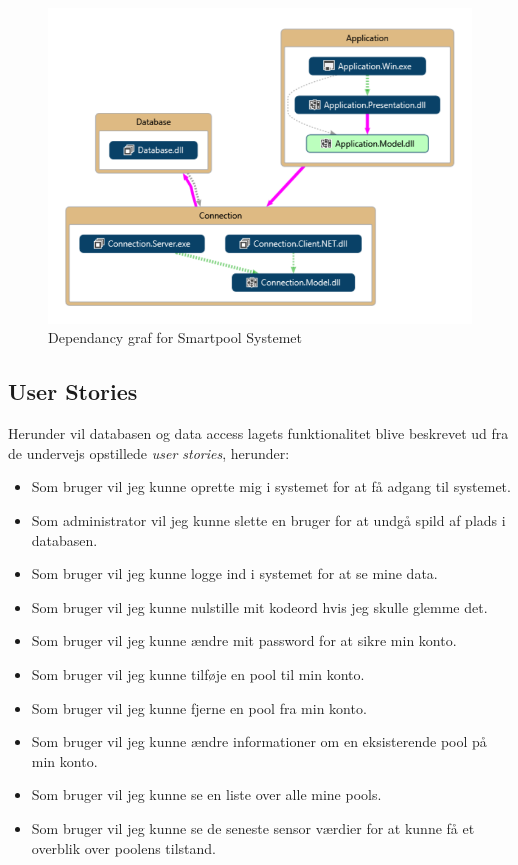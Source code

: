 \begin{figure}[h]
	\centering
	\includegraphics[width=0.8\linewidth]{figs/design/vs_codeMap.PNG}
	\caption{Dependancy graf for Smartpool Systemet}
	\label{fig:vs_codeMap}
\end{figure}

\subsection{User Stories}
Herunder vil databasen og data access lagets funktionalitet blive beskrevet ud fra de undervejs opstillede \textit{user stories}, herunder:

\begin{itemize}
	\item Som bruger vil jeg kunne oprette mig i systemet for at få adgang til systemet.
	\item Som administrator vil jeg kunne slette en bruger for at undgå spild af plads i databasen.
	\item Som bruger vil jeg kunne logge ind i systemet for at se mine data.
	\item Som bruger vil jeg kunne nulstille mit kodeord hvis jeg skulle glemme det.
	\item Som bruger vil jeg kunne ændre mit password for at sikre min konto.
	\item Som bruger vil jeg kunne tilføje en pool til min konto.
	\item Som bruger vil jeg kunne fjerne en pool fra min konto.
	\item Som bruger vil jeg kunne ændre informationer om en eksisterende pool på min konto.
	\item Som bruger vil jeg kunne se en liste over alle mine pools.
	\item Som bruger vil jeg kunne se de seneste sensor værdier for at kunne få et overblik over poolens tilstand.
\end{itemize}

